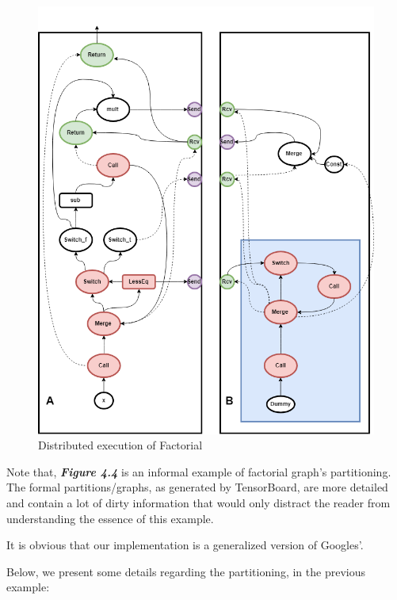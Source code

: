 \documentclass[ack,preface]{dithesis}
\begin{document}
\begin{figure}
\centering
\includegraphics[scale=0.6]{figures/DistrFac}
\caption{Distributed execution of Factorial}
\end{figure}

Note that, \textit{\textbf{Figure 4.4}} is an informal example of factorial graph's partitioning. The formal partitions/graphs, as generated by TensorBoard, are more detailed and contain a lot of dirty information that would only distract the reader from understanding the essence of this example. 

It is obvious that our implementation is a generalized version of Googles'. 

Below, we present some details regarding the partitioning, in the previous example:
    
\end{document}
